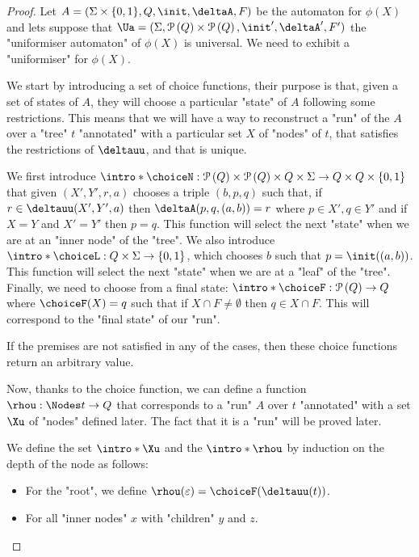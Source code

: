 \documentclass[a4paper,UKenglish,cleveref, autoref, thm-restate]{lipics-v2021}
\begin{document}
\begin{proof}
	Let $A =  (\Sigma \times \{0,1\}, Q, \init, \deltaA, F)$ be the automaton for $\phi(X)$ and lets suppose that
	$\Ua = (\Sigma, \parts Q \times \parts Q,\init', \deltaA', F')$ the "uniformiser automaton" of $\phi(X)$ is universal.
	We need to exhibit a "uniformiser" for $\phi(X)$.

	\AP We start by introducing a set of choice functions, their purpose is that, given a set of states of $A$, they will choose
	a particular "state" of $A$ following some restrictions. This means that we will have a way to reconstruct a "run" of the $A$ over a "tree" $t$ "annotated" with a 
    particular set $X$ of "nodes" of $t$, that satisfies the restrictions of $\deltauu$, and that is unique.
	\begin{itemize}
		\itemAP We first introduce $\intro*\choiceN : \parts Q \times \parts Q \times Q \times \Sigma \to Q \times Q \times \set{0,1}$
		that given $(X',Y',r,a)$ chooses a triple $(b,p,q)$ such that, if $r \in \deltauu(X',Y', a)$ then $\deltaA(p,q,(a,b)) = r$ where $p \in X', q \in Y'$
		and if $X = Y$ and  $X' = Y'$ then $p = q$. This function will select the next "state" when we are at an "inner node" of the "tree".
		\itemAP We also introduce $\intro* \choiceL : Q \times \Sigma \to \set{0,1} $, which chooses $b$ such that $p = \init((a,b))$. This function
		will select the next "state" when we are at a "leaf" of the "tree".
		\itemAP
		Finally, we need to choose from a final state: $\intro* \choiceF : \parts Q \to  Q$ where
		$\choiceF (X) = q$ such that if $X \cap F \neq \emptyset$ then $q \in X \cap F$. This will correspond to the "final state" of our "run".
	\end{itemize}
	If the premises are not satisfied in any of the cases, then these choice functions return an arbitrary value.

    Now, thanks to the choice function, we can define a function $\rhou : \Nodes t \to Q$ that corresponds to a "run" $A$ over $t$ "annotated" with a set $\Xu$ of "nodes" defined later.
    The fact that it is a "run" will be proved later.

	\AP We define the set $\intro*\Xu$ and the  $\intro*\rhou$  by induction on the depth of the node as follows:
	\begin{itemize}
		\item For the "root", we define $\rhou(\varepsilon) = \choiceF(\deltauu(t))$.
		\item For all "inner nodes" $x$ with "children" $y$ and $z$. 
             

\end{itemize}
\end{proof}
\end{document}
